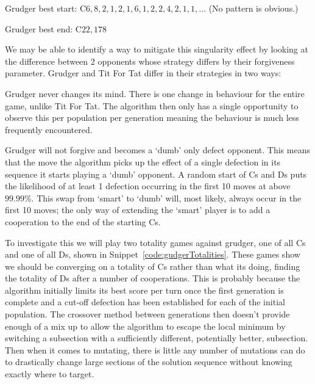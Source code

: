 Grudger best start: C$6,8,2,1,2,1,6,1,2,2,4,2,1,1,\ldots$ (No pattern is obvious.)

Grudger best end: C$22,178$

We may be able to identify a way to mitigate this singularity effect by looking at the difference between 2 opponents whose strategy differs by their forgiveness parameter.
Grudger and Tit For Tat differ in their strategies in two ways:
\begin{itemize}
    \begin{item}
        Grudger never changes its mind.
        There is one change in behaviour for the entire game, unlike Tit For Tat.
        The algorithm then only has a single opportunity to observe this per population per generation meaning the behaviour is much less frequently encountered.
    \end{item}
    \begin{item}
        Grudger will not forgive and becomes a `dumb' only defect opponent.
        This means that the move the algorithm picks up the effect of a single defection in its sequence it starts playing a `dumb' opponent.
        A random start of Cs and Ds puts the likelihood of at least 1 defection occurring in the first 10 moves at above \(99.99\% \).
        This swap from `smart' to `dumb' will, most likely, always occur in the first 10 moves;
        the only way of extending the `smart' player is to add a cooperation to the end of the starting Cs.
    \end{item}
\end{itemize}

To investigate this we will play two totality games against grudger, one of all Cs and one of all Ds, shown in Snippet~\ref{code:gudgerTotalities}. 
These games show we should be converging on a totality of Cs rather than what its doing, finding the totality of Ds after a number of cooperations.
This is probably because the algorithm initially limits its best score per turn once the first generation is complete and a cut-off defection has been established for each of the initial population.
The crossover method between generations then doesn't provide enough of a mix up to allow the algorithm to escape the local minimum by switching a subsection with a sufficiently different, potentially better, subsection.
Then when it comes to mutating, there is little any number of mutations can do to drastically change large sections of the solution sequence without knowing exactly where to target.

